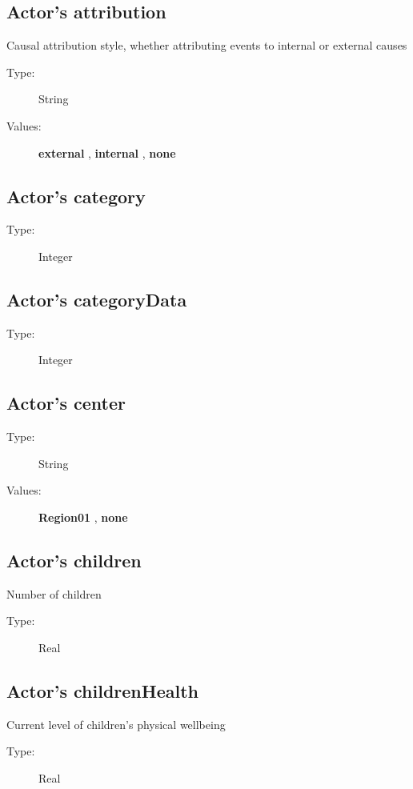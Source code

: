 \documentclass{article}%
\begin{document}
%
\subsection{Actor's attribution}%
\label{subsec:Actor's attribution}%
Causal attribution style, whether attributing events to internal or external causes%
\begin{description}%
\item[Type:]%
String%
\item[Values:]%
\textbf{external}%
, %
\textbf{internal}%
, %
\textbf{none}%
\end{description}

%
\subsection{Actor's category}%
\label{subsec:Actor's category}%
\begin{description}%
\item[Type:]%
Integer%
\end{description}

%
\subsection{Actor's categoryData}%
\label{subsec:Actor's categoryData}%
\begin{description}%
\item[Type:]%
Integer%
\end{description}

%
\subsection{Actor's center}%
\label{subsec:Actor's center}%
\begin{description}%
\item[Type:]%
String%
\item[Values:]%
\textbf{Region01}%
, %
\textbf{none}%
\end{description}

%
\subsection{Actor's children}%
\label{subsec:Actor's children}%
Number of children%
\begin{description}%
\item[Type:]%
Real%
\end{description}

%
\subsection{Actor's childrenHealth}%
\label{subsec:Actor's childrenHealth}%
Current level of children's physical wellbeing%
\begin{description}%
\item[Type:]%
Real%
\end{description}%
\end{document}
